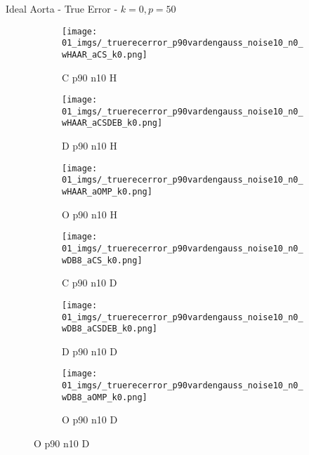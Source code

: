 \begin{frame}{Ideal Aorta - True Error - $k=0,p=50$}{}
\begin{figure}
\begin{subfigure}{0.13\textwidth}
\texttt{[image: 01\_imgs/\_truerecerror\_p90vardengauss\_noise10\_n0\_wHAAR\_aCS\_k0.png]}
\caption*{\tiny C p90 n10 H}
\end{subfigure}
\begin{subfigure}{0.13\textwidth}
\texttt{[image: 01\_imgs/\_truerecerror\_p90vardengauss\_noise10\_n0\_wHAAR\_aCSDEB\_k0.png]}
\caption*{\tiny D p90 n10 H}
\end{subfigure}
\begin{subfigure}{0.13\textwidth}
\texttt{[image: 01\_imgs/\_truerecerror\_p90vardengauss\_noise10\_n0\_wHAAR\_aOMP\_k0.png]}
\caption*{\tiny O p90 n10 H}
\end{subfigure}
\begin{subfigure}{0.13\textwidth}
\texttt{[image: 01\_imgs/\_truerecerror\_p90vardengauss\_noise10\_n0\_wDB8\_aCS\_k0.png]}
\caption*{\tiny C p90 n10 D}
\end{subfigure}
\begin{subfigure}{0.13\textwidth}
\texttt{[image: 01\_imgs/\_truerecerror\_p90vardengauss\_noise10\_n0\_wDB8\_aCSDEB\_k0.png]}
\caption*{\tiny D p90 n10 D}
\end{subfigure}
\begin{subfigure}{0.13\textwidth}
\texttt{[image: 01\_imgs/\_truerecerror\_p90vardengauss\_noise10\_n0\_wDB8\_aOMP\_k0.png]}
\caption*{\tiny O p90 n10 D}
\end{subfigure}

\vspace{5pt}


\end{figure}
\end{frame}
